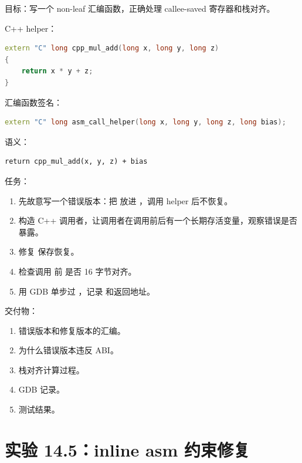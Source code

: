\begin{labbox}
目标：写一个 non-leaf 汇编函数，正确处理 callee-saved 寄存器和栈对齐。

C++ helper：

\begin{lstlisting}[language=C++]
extern "C" long cpp_mul_add(long x, long y, long z)
{
    return x * y + z;
}
\end{lstlisting}

汇编函数签名：

\begin{lstlisting}[language=C++]
extern "C" long asm_call_helper(long x, long y, long z, long bias);
\end{lstlisting}

语义：

\begin{lstlisting}
return cpp_mul_add(x, y, z) + bias
\end{lstlisting}

任务：

\begin{enumerate}
  \item 先故意写一个错误版本：把  放进 ，调用 helper 后不恢复。
  \item 构造 C++ 调用者，让调用者在调用前后有一个长期存活变量，观察错误是否暴露。
  \item 修复  保存恢复。
  \item 检查调用  前  是否 16 字节对齐。
  \item 用 GDB 单步过 ，记录  和返回地址。
\end{enumerate}

交付物：

\begin{enumerate}
  \item 错误版本和修复版本的汇编。
  \item 为什么错误版本违反 ABI。
  \item 栈对齐计算过程。
  \item GDB 记录。
  \item 测试结果。
\end{enumerate}
\end{labbox}

\section{实验 14.5：inline asm 约束修复}

